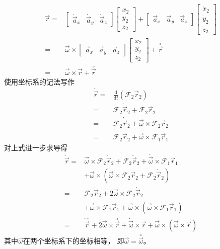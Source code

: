 \begin{align*}
    \dot{\vec{r}}
    =& \left[\begin{matrix}
        \dot{\vec{a}}_x & \dot{\vec{a}}_y & \dot{\vec{a}}_z
    \end{matrix}\right]
    \left[\begin{matrix}
        x_2 \\ y_2 \\ z_2
    \end{matrix}\right]
    + \left[\begin{matrix}
        \vec{a}_x & \vec{a}_y & \vec{a}_z
    \end{matrix}\right]
    \left[\begin{matrix}
        \dot{x}_2 \\ \dot{y}_2 \\ \dot{z}_2
    \end{matrix}\right] \\
    =& \vec{\omega}\times
    \left[\begin{matrix}
        \vec{a}_x & \vec{a}_y & \vec{a}_z
    \end{matrix}\right]
    \left[\begin{matrix}
        x_2 \\ y_2 \\ z_2
    \end{matrix}\right]
    + \overset{\circ}{\vec{r}} \\
    =& \vec{\omega}\times\vec{r} + \overset{\circ}{\vec{r}}
\end{align*}
使用坐标系的记法写作
\begin{align*}
    \dot{\vec{r}}
    =& \frac{\text{d}}{\text{d}t}(\mathcal{F}_2\vec{r}_2) \\
    =& \mathcal{F}_2\dot{\vec{r}}_2
    + \dot{\mathcal{F}_2}\vec{r}_2 \\
    =& \mathcal{F}_2\dot{\vec{r}}_2
    + \vec{\omega} \times \mathcal{F}_2\vec{r}_2 \\
    =& \mathcal{F}_2\dot{\vec{r}}_2
    + \vec{\omega} \times \mathcal{F}_1\vec{r}_1
\end{align*}
对上式进一步求导得
\begin{align*}
    \ddot{\vec{r}}
    =& \vec{\omega} \times \mathcal{F}_2\dot{\vec{r}}_2
    + \mathcal{F}_2\ddot{\vec{r}}_2
    + \dot{\vec{\omega}} \times \mathcal{F}_1\vec{r}_1 \\
    &+ \vec{\omega} \times (\vec{\omega} \times \mathcal{F}_2\vec{r}_2
    + \mathcal{F}_2\dot{\vec{r}}_2) \\
    =& \mathcal{F}_2\ddot{\vec{r}}_2
    + 2\vec{\omega} \times \mathcal{F}_2\dot{\vec{r}}_2 \\
    &+ \dot{\vec{\omega}} \times \mathcal{F}_1\vec{r}_1
    + \vec{\omega} \times (\vec{\omega} \times \mathcal{F}_1\vec{r}_1) \\
    =& \overset{\circ\circ}{\vec{r}}
    + 2\vec{\omega}\times\overset{\circ}{\vec{r}}
    + \dot{\vec{\omega}}\times\vec{r}
    + \vec{\omega}\times(\vec{\omega}\times\vec{r})
\end{align*}
其中$\vec{\omega}$在两个坐标系下的坐标相等，
即$\dot{\vec{\omega}}=\overset{\circ}{\vec{\omega}}$。

